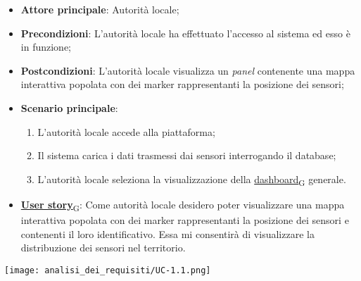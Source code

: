 \begin{itemize}
	\item \textbf{Attore principale}: Autorità locale;
	\item \textbf{Precondizioni}: L'autorità locale ha effettuato l'accesso al sistema ed esso è in funzione;
	\item \textbf{Postcondizioni}: L'autorità locale visualizza un \textit{panel} contenente una mappa interattiva
	      popolata con dei marker rappresentanti la posizione dei sensori;
	\item \textbf{Scenario principale}:
	      \begin{enumerate}
		      \item L'autorità locale accede alla piattaforma;
		      \item Il sistema carica i dati trasmessi dai sensori interrogando il database;
		      \item L'autorità locale seleziona la visualizzazione della \href{https://7last.github.io/docs/rtb/documentazione-interna/glossario\#dashboard}{dashboard\textsubscript{G}} generale.
	      \end{enumerate}
	\item \href{https://7last.github.io/docs/rtb/documentazione-interna/glossario\#user-story}{\textbf{User story}\textsubscript{G}}: Come autorità locale desidero poter visualizzare una mappa interattiva popolata con dei marker rappresentanti
	      la posizione dei sensori e contenenti il loro identificativo. Essa mi consentirà di visualizzare la distribuzione dei sensori nel territorio.
\end{itemize}

\begin{center}
	\texttt{[image: analisi\_dei\_requisiti/UC-1.1.png]}
\end{center}

